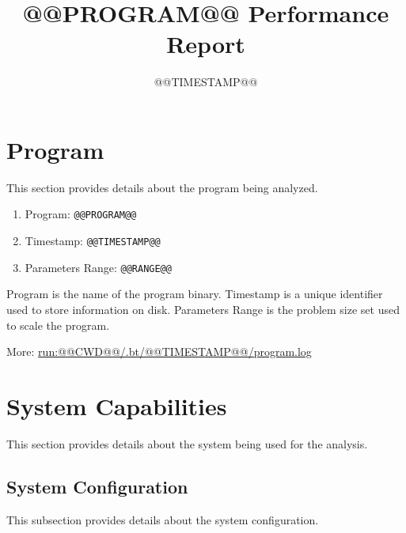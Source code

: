\documentclass[a4paper]{article}
\begin{document}
\title{@@PROGRAM@@ Performance Report}

\date{@@TIMESTAMP@@}

\maketitle


\tableofcontents

\section{Program}

This section provides details about the program being analyzed.

\begin{enumerate}
\item Program: {\tt @@PROGRAM@@}
\item Timestamp: {\tt @@TIMESTAMP@@}
\item Parameters Range: {\tt @@RANGE@@}
\end{enumerate}

Program is the name of the program binary.
Timestamp is a unique identifier used to store information on disk.
Parameters Range is the problem size set used to scale the program. 

More: \url{run:@@CWD@@/.bt/@@TIMESTAMP@@/program.log}

\section{System Capabilities}

This section provides details about the system being used for the analysis.

\subsection{System Configuration}

This subsection provides details about the system configuration.
\end{document}
